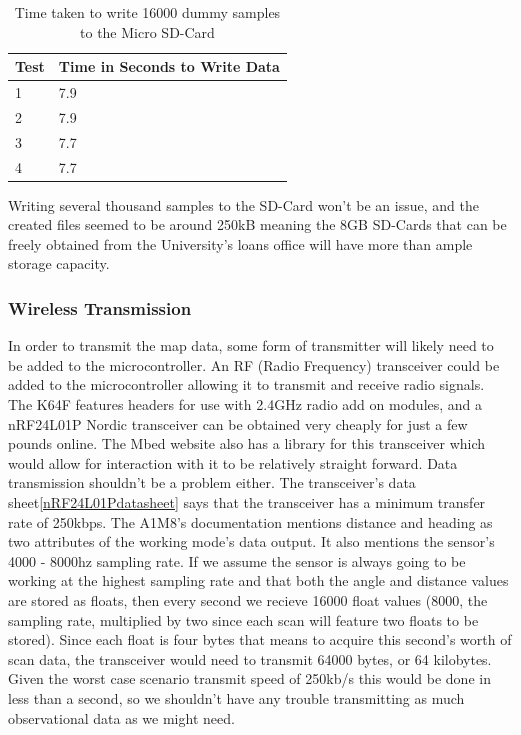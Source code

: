 					\begin{table}[h!]
						\centering
						\begin{tabular}{|| l | l ||} 
							\hline
							Test & Time in Seconds to Write Data \\ [0.5ex] 
							\hline
							1 & 7.9 \\ 
							2 & 7.9 \\
							3 & 7.7 \\
							4 & 7.7 \\ [1ex] 
							\hline
						\end{tabular}
						\caption{Time taken to write 16000 dummy samples to the Micro SD-Card}
						\label{table:filewritetests}		
					\end{table}
					Writing several thousand samples to the SD-Card won't be an issue, and the created files seemed to be around 250kB meaning the 8GB SD-Cards that can be freely obtained from the University's loans office will have more than ample storage capacity.
					
					\subsubsection{Wireless Transmission}
					In order to transmit the map data, some form of transmitter will likely need to be added to the microcontroller. An RF (Radio Frequency) transceiver could be added to the microcontroller allowing it to transmit and receive radio signals. The K64F features headers for use with 2.4GHz radio add on modules, and a nRF24L01P Nordic transceiver can be obtained very cheaply for just a few pounds online. The Mbed website also has a library\citep{nRF24L01Plibrary} for this transceiver which would allow for interaction with it to be relatively straight forward. Data transmission shouldn't be a problem either. The transceiver's data sheet\ref{nRF24L01Pdatasheet} says that the transceiver has a minimum transfer rate of 250kbps. The A1M8's documentation\cite{rplidara1m8datasheet} mentions distance and heading as two attributes of the working mode's data output. It also mentions the sensor's 4000 - 8000hz sampling rate. If we assume the sensor is always going to be working at the highest sampling rate and that both the angle and distance values are stored as floats, then every second we recieve 16000 float values (8000, the sampling rate, multiplied by two since each scan will feature two floats to be stored). Since each float is four bytes that means to acquire this second's worth of scan data, the transceiver would need to transmit 64000 bytes, or 64 kilobytes. Given the worst case scenario transmit speed of 250kb/s this would be done in less than a second, so we shouldn't have any trouble transmitting as much observational data as we might need.
					
